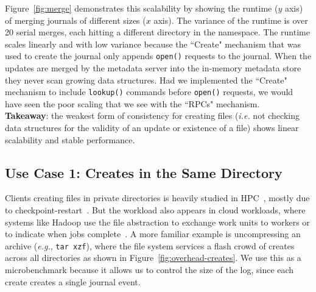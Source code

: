 Figure~\ref{fig:merge} demonstrates this scalability by showing the runtime
(\(y\) axis) of merging journals of different sizes (\(x\) axis). The variance
of the runtime is over 20 serial merges, each hitting a different directory in
the namespace.  The runtime scales linearly and with low variance because the
``Create" mechanism that was used to create the journal only appends
\texttt{open()} requests to the journal. When the updates are merged by the
metadata server into the in-memory metadata store they never scan growing data
structures. Had we implemented the ``Create" mechanism to include
\texttt{lookup()} commands before \texttt{open()} requests, we would have seen
the poor scaling that we see with the ``RPCs" mechanism.\\

\noindent\textbf{Takeaway}: the weakest form of consistency for creating files
({\it i.e.} not checking data structures for the validity of an update or
existence of a file) shows linear scalability and stable performance.



\subsection{Use Case 1: Creates in the Same Directory}
\label{use-case-1}

Clients creating files in private directories is heavily studied in
HPC~\cite{weil:sc2004-dyn-metadata, ren:sc2014-indexfs, patil:fast2011-giga,
zheng:pdsw2014-batchfs, sevilla:sc15-mantle}, mostly due to
checkpoint-restart~\cite{bent_plfs_2009}.  But the workload also appears in
cloud workloads, where systems like Hadoop use the file abstraction to exchange
work units to workers or to indicate when jobs
complete~\cite{shvachko:login2012-hdfs-scalability}. A more familiar example is
uncompressing an archive ({\it e.g.}, \texttt{tar xzf}), where the file system
services a flash crowd of creates across all directories as shown in
Figure~\ref{fig:overhead-creates}.  We use this as a microbenchmark because it
allows us to control the size of the log, since each create creates a single
journal event.


